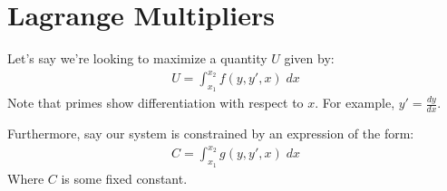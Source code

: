 \documentclass{article}
\begin{document}
\section*{Lagrange Multipliers}

Let's say we're looking to maximize a quantity $U$ given by:
\begin{align}
    \label{defu}
    U = \displaystyle\int_{x_1}^{x_2} f(y, y', x) \; dx    
\end{align}
Note that primes show differentiation with respect to $x$. For example, $y' = \tfrac{dy}{dx}$.

Furthermore, say our system is constrained by an expression of the form:
\begin{align}
    \label{defc}
    C = \displaystyle\int_{x_1}^{x_2} g(y, y', x) \; dx
\end{align}
Where $C$ is some fixed constant.
\end{document}

